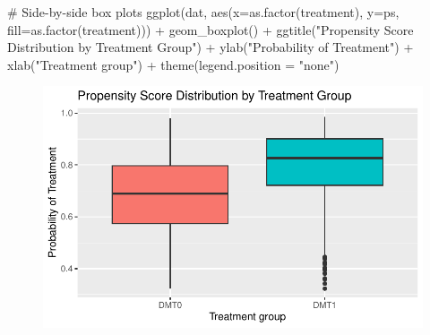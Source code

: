 \documentclass[
  letterpaper,
  DIV=11,
  numbers=noendperiod]{scrreprt}
\newenvironment{Shaded}{\begin{snugshade}}{\end{snugshade}}
\newcommand{\AttributeTok}[1]{\textcolor[rgb]{0.40,0.45,0.13}{#1}}
\newcommand{\CommentTok}[1]{\textcolor[rgb]{0.37,0.37,0.37}{#1}}
\newcommand{\FunctionTok}[1]{\textcolor[rgb]{0.28,0.35,0.67}{#1}}
\newcommand{\NormalTok}[1]{\textcolor[rgb]{0.00,0.23,0.31}{#1}}
\newcommand{\SpecialCharTok}[1]{\textcolor[rgb]{0.37,0.37,0.37}{#1}}
\newcommand{\StringTok}[1]{\textcolor[rgb]{0.13,0.47,0.30}{#1}}
\begin{document}
\begin{Shaded}
\begin{Highlighting}[]
\CommentTok{\# Side{-}by{-}side box plots}
\FunctionTok{ggplot}\NormalTok{(dat, }\FunctionTok{aes}\NormalTok{(}\AttributeTok{x=}\FunctionTok{as.factor}\NormalTok{(treatment), }\AttributeTok{y=}\NormalTok{ps, }\AttributeTok{fill=}\FunctionTok{as.factor}\NormalTok{(treatment))) }\SpecialCharTok{+}
  \FunctionTok{geom\_boxplot}\NormalTok{() }\SpecialCharTok{+} 
  \FunctionTok{ggtitle}\NormalTok{(}\StringTok{"Propensity Score Distribution by Treatment Group"}\NormalTok{) }\SpecialCharTok{+}
  \FunctionTok{ylab}\NormalTok{(}\StringTok{"Probability of Treatment"}\NormalTok{) }\SpecialCharTok{+} 
  \FunctionTok{xlab}\NormalTok{(}\StringTok{"Treatment group"}\NormalTok{) }\SpecialCharTok{+}
  \FunctionTok{theme}\NormalTok{(}\AttributeTok{legend.position =} \StringTok{"none"}\NormalTok{)}
\end{Highlighting}
\end{Shaded}

\begin{figure}[H]

{\centering \includegraphics{chapter_06_files/figure-pdf/unnamed-chunk-8-2.pdf}

}

\end{figure}

\begin{Shaded}
\end{Shaded}
\end{document}

